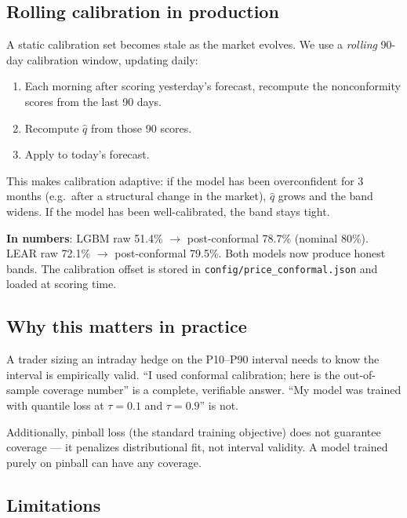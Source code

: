 \subsection{Rolling calibration in production}

A static calibration set becomes stale as the market evolves. We use a
\emph{rolling} 90-day calibration window, updating daily:

\begin{enumerate}
  \item Each morning after scoring yesterday's forecast, recompute the
        nonconformity scores from the last 90 days.
  \item Recompute $\hat{q}$ from those 90 scores.
  \item Apply to today's forecast.
\end{enumerate}

This makes calibration adaptive: if the model has been overconfident for
3 months (e.g.\ after a structural change in the market), $\hat{q}$
grows and the band widens. If the model has been well-calibrated, the
band stays tight.

\textbf{In numbers}: LGBM raw 51.4\% $\to$ post-conformal 78.7\%
(nominal 80\%). LEAR raw 72.1\% $\to$ post-conformal 79.5\%.
Both models now produce honest bands. The calibration offset is stored in
\texttt{config/price\_conformal.json} and loaded at scoring time.

\subsection{Why this matters in practice}

A trader sizing an intraday hedge on the P10--P90 interval needs to know
the interval is empirically valid. ``I used conformal calibration; here
is the out-of-sample coverage number'' is a complete, verifiable answer.
``My model was trained with quantile loss at $\tau = 0.1$ and $\tau = 0.9$''
is not.

Additionally, pinball loss (the standard training objective) does not
guarantee coverage --- it penalizes distributional fit, not interval validity.
A model trained purely on pinball can have any coverage.

\subsection{Limitations}

